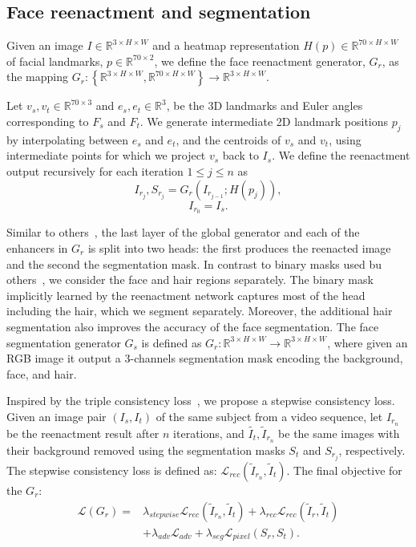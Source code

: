 \subsection{Face reenactment and segmentation}
\label{subsec:Reenactment and Segmentation}
Given an image $I\in\mathbb{R}^{3\times H\times W}$ and a heatmap
representation $H(p)\in\mathbb{R}^{70\times H\times W}$ of facial landmarks,
$p\in\mathbb{R}^{70\times2}$, we define the face reenactment generator, $G_{r}$,
as the mapping $G_{r}:\left\{  \mathbb{R}^{3\times H\times W},\mathbb{R}%
^{70\times H\times W}\right\}  \rightarrow\mathbb{R}^{3\times H\times W}$. 

Let
$v_{s},v_{t}\in\mathbb{R}^{70\times3}$ and $e_{s},e_{t}\in\mathbb{R}^{3}$, be
the 3D landmarks and Euler angles corresponding to $F_{s}$ and $F_{t}$. We generate intermediate 2D landmark positions $p_{j}$ by interpolating between $e_{s}$ and $e_{t}$, and the centroids of $v_{s}$ and $v_{t}$, using intermediate points for which we project $v_{s}$ back to $I_{s}$. We define the reenactment
output recursively for each iteration $1\leq j\leq n$ as
\begin{equation}
I_{r_{j}},S_{r_{j}}=G_{r}(I_{r_{j-1}};H(p_{j})),
\end{equation}
$$I_{r_{0}}=I_{s}.$$

Similar to others~\cite{pumarola2018ganimation}, the last layer of the global generator and each of the enhancers in $G_{r}$ is split into two heads: the first produces the reenacted image and the second the segmentation mask. In contrast to binary masks used bu others~\cite{pumarola2018ganimation}, we consider the face and hair regions separately. The binary mask implicitly
learned by the reenactment network captures most of the head including the hair, which we segment separately. Moreover, the additional hair segmentation also improves the accuracy of the face segmentation. The face segmentation generator $G_{s}$ is defined as $G_{r}:\mathbb{R}^{3\times H\times
W}\rightarrow\mathbb{R}^{3\times H\times W}$, where given an RGB image it output a 3-channels segmentation mask encoding the background, face, and hair.

Inspired by the triple consistency loss~\cite{sanchez2018triple}, we propose a stepwise consistency loss. Given an image pair $(I_s,I_t)$ of the same subject from a video sequence, let $I_{r_n}$ be the reenactment result after $n$ iterations, and $\widetilde{I_t},\widetilde{I}_{r_n}$ be the same images with their background removed using the segmentation masks $S_t$ and $S_{r_j}$, respectively. The stepwise consistency loss is defined as: $\mathcal{L}_{rec}(\widetilde{I}_{r_n},\widetilde{I}_t)$.
The final objective for the $G_r$:
\begin{align}
\mathcal{L}(G_r)=&\lambda_{stepwise}\mathcal{L}_{rec}(\widetilde{I}_{r_n},\widetilde{I}_t)+\lambda_{rec}\mathcal{L}_{rec}(\widetilde{I}_r,\widetilde{I}_t)\nonumber\\&+\lambda_{adv}\mathcal{L}_{adv}+\lambda_{seg}\mathcal{L}_{pixel}(S_r,S_t).
\end{align}

